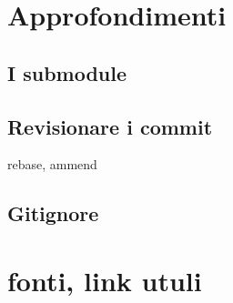 \documentclass{article} \usepackage[textwidth=18cm,textheight=18cm]{geometry}
\begin{document}
\section{Approfondimenti}

\subsection{I submodule}

\subsection{Revisionare i commit}

rebase, ammend

\subsection{Gitignore}

\section{fonti, link utuli}
\end{document}
